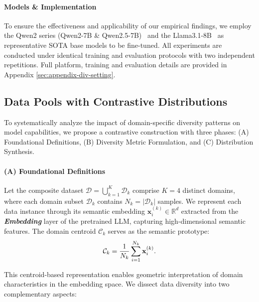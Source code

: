 \paragraph{Models \& Implementation}
To ensure the effectiveness and applicability of our empirical findings, we employ the Qwen2 series (Qwen2-7B \& Qwen2.5-7B)~\cite{qwen2series} and the Llama3.1-8B~\cite{llama3series} as representative SOTA base models to be fine-tuned.
All experiments are conducted under identical training and evaluation protocols with two independent repetitions. Full platform, training and evaluation details are provided in Appendix \ref{sec:appendix-div-setting}.


\subsection{Data Pools with Contrastive  Distributions}
\label{sec:obser:contrastive-dist}

To systematically analyze the impact of domain-specific diversity patterns on model capabilities, we propose a contrastive construction with three phases: (A) Foundational Definitions, (B) Diversity Metric Formulation, and (C) Distribution Synthesis.

\paragraph{(A) Foundational Definitions} 
Let the composite dataset \( \mathcal{D} = \bigcup_{k=1}^K \mathcal{D}_k \) comprise \( K=4 \) distinct domains, where each domain subset \( \mathcal{D}_k \) contains \( N_k = |\mathcal{D}_k| \) samples. We represent each data instance through its semantic embedding \( \mathbf{x}_i^{(k)} \in \mathbb{R}^d \) extracted from the \textbf{\textit{Embedding}} layer of the pretrained LLM, capturing high-dimensional semantic features. The domain centroid \( \mathcal{C}_k \) serves as the semantic prototype:
\begin{equation}
\small
\mathcal{C}_k = \frac{1}{N_k} \sum_{i=1}^{N_k} \mathbf{x}_i^{(k)}.
\end{equation}

This centroid-based representation enables geometric interpretation of domain characteristics in the embedding space. We dissect data diversity into two complementary aspects:

